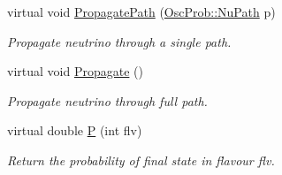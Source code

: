 \begin{DoxyCompactItemize}
virtual void \hyperlink{classOscProb_1_1PMNS__Base_accb08503acc162188041d7a96a280462}{Propagate\+Path} (\hyperlink{structOscProb_1_1NuPath}{Osc\+Prob\+::\+Nu\+Path} p)
\begin{DoxyCompactList}\small\item\em Propagate neutrino through a single path. \end{DoxyCompactList}\item 
virtual void \hyperlink{classOscProb_1_1PMNS__Base_a054e3a8b05b9a958b6fa416e4a835e3e}{Propagate} ()
\begin{DoxyCompactList}\small\item\em Propagate neutrino through full path. \end{DoxyCompactList}\item 
virtual double \hyperlink{classOscProb_1_1PMNS__Base_a0dc4d45bc3d7e03b9abbf5b4e100cc22}{P} (int flv)
\begin{DoxyCompactList}\small\item\em Return the probability of final state in flavour flv. \end{DoxyCompactList}\end{DoxyCompactItemize}
